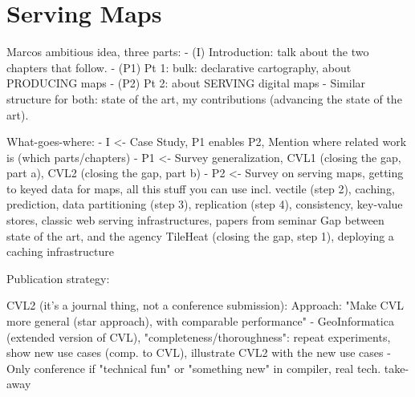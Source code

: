 \documentclass[11pt, oneside]{report}   	%
\begin{document}
\part{Serving Maps}






Marcos ambitious idea, three parts:
- (I) Introduction: talk about the two chapters that follow. 
- (P1) Pt 1: bulk: declarative cartography, about PRODUCING maps
- (P2) Pt 2: about SERVING digital maps
- Similar structure for both: state of the art, my contributions (advancing the state of the art).  

What-goes-where:
- I <- Case Study, P1 enables P2, Mention where related work is (which parts/chapters)
- P1 <- 
        Survey generalization, 
        CVL1 (closing the gap, part a), 
        CVL2 (closing the gap, part b)
- P2 <- 
        Survey on serving maps, getting to keyed data for maps, all this stuff you can use 
                incl. vectile (step 2),
                caching,
                prediction,
                data partitioning (step 3), 
                replication (step 4), 
                consistency, 
                key-value stores, 
                classic web serving infrastructures,
                papers from seminar
        Gap between state of the art, and the agency
        TileHeat (closing the gap, step 1), deploying a caching infrastructure
        
Publication strategy:

CVL2 (it's a journal thing, not a conference submission):
Approach: "Make CVL more general (star approach), with comparable performance"
- GeoInformatica (extended version of CVL), "completeness/thoroughness": repeat experiments, show new use cases (comp. to CVL), illustrate CVL2 with the new use cases 
- Only conference if "technical fun" or "something new" in compiler, real tech. take-away
\end{document}
